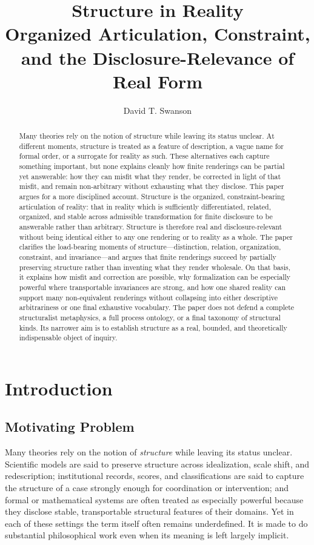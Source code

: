 \documentclass[11pt]{article}
\title{\textbf{Structure in Reality}\\
\large Organized Articulation, Constraint, and the Disclosure-Relevance of Real Form}
\author{David T. Swanson}
\date{}
\renewcommand{\emph}[1]{\textit{#1}}
\begin{document}
\maketitle

\begin{abstract}
Many theories rely on the notion of structure while leaving its status unclear. At different moments, structure is treated as a feature of description, a vague name for formal order, or a surrogate for reality as such. These alternatives each capture something important, but none explains cleanly how finite renderings can be partial yet answerable: how they can misfit what they render, be corrected in light of that misfit, and remain non-arbitrary without exhausting what they disclose. This paper argues for a more disciplined account. Structure is the organized, constraint-bearing articulation of reality: that in reality which is sufficiently differentiated, related, organized, and stable across admissible transformation for finite disclosure to be answerable rather than arbitrary. Structure is therefore real and disclosure-relevant without being identical either to any one rendering or to reality as a whole. The paper clarifies the load-bearing moments of structure---distinction, relation, organization, constraint, and invariance---and argues that finite renderings succeed by partially preserving structure rather than inventing what they render wholesale. On that basis, it explains how misfit and correction are possible, why formalization can be especially powerful where transportable invariances are strong, and how one shared reality can support many non-equivalent renderings without collapsing into either descriptive arbitrariness or one final exhaustive vocabulary. The paper does not defend a complete structuralist metaphysics, a full process ontology, or a final taxonomy of structural kinds. Its narrower aim is to establish structure as a real, bounded, and theoretically indispensable object of inquiry.
\end{abstract}
\pagebreak
\section{Introduction}

\subsection{Motivating Problem}

Many theories rely on the notion of \emph{structure} while leaving its status unclear. Scientific models are said to preserve structure across idealization, scale shift, and redescription; institutional records, scores, and classifications are said to capture the structure of a case strongly enough for coordination or intervention; and formal or mathematical systems are often treated as especially powerful because they disclose stable, transportable structural features of their domains. Yet in each of these settings the term itself often remains underdefined. It is made to do substantial philosophical work even when its meaning is left largely implicit. \cite{FriggNguyen2021ScientificRepresentationSEP,FriggHartmann2025ModelsScienceSEP,BowkerStar1999SortingThingsOut}
\end{document}
